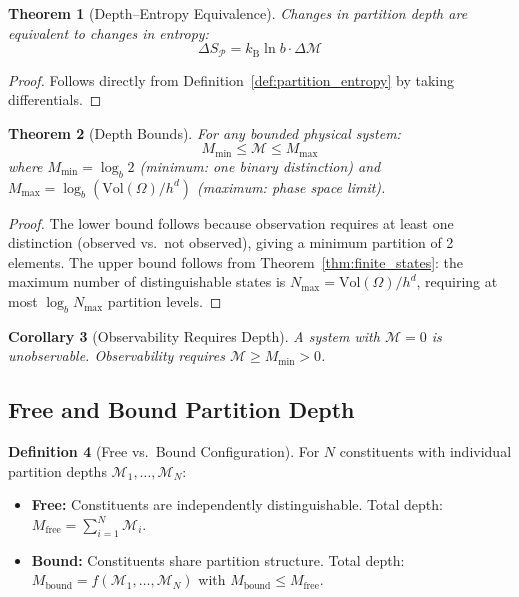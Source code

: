 \documentclass[twocolumn,10pt,a4paper]{article}
\theoremstyle{plain}
\newtheorem{theorem}{Theorem}[section]
\newtheorem{corollary}[theorem]{Corollary}
\theoremstyle{definition}
\newtheorem{definition}[theorem]{Definition}
\theoremstyle{remark}
\newcommand{\kB}{k_{\mathrm{B}}}
\newcommand{\Depth}{\mathcal{M}}
\newcommand{\Mfree}{M_{\mathrm{free}}}
\newcommand{\Mbound}{M_{\mathrm{bound}}}
\newcommand{\Mmax}{M_{\mathrm{max}}}
\newcommand{\Mmin}{M_{\mathrm{min}}}
\newcommand{\Partition}{\mathcal{P}}
\begin{document}
\begin{theorem}[Depth--Entropy Equivalence]
\label{thm:depth_entropy}
Changes in partition depth are equivalent to changes in entropy:
\begin{equation}
    \Delta S_\Partition = \kB \ln b \cdot \Delta\Depth
\end{equation}
\end{theorem}

\begin{proof}
Follows directly from Definition~\ref{def:partition_entropy} by taking differentials.
\end{proof}

\begin{theorem}[Depth Bounds]
\label{thm:depth_bounds}
For any bounded physical system:
\begin{equation}
    \Mmin \leq \Depth \leq \Mmax
\end{equation}
where $\Mmin = \log_b 2$ (minimum: one binary distinction) and $\Mmax = \log_b({\mathrm{Vol}(\Omega)}/{h^d})$ (maximum: phase space limit).
\end{theorem}

\begin{proof}
The lower bound follows because observation requires at least one distinction (observed vs.\ not observed), giving a minimum partition of 2 elements. The upper bound follows from Theorem~\ref{thm:finite_states}: the maximum number of distinguishable states is $N_{\max} = \mathrm{Vol}(\Omega)/h^d$, requiring at most $\log_b N_{\max}$ partition levels.
\end{proof}

\begin{corollary}[Observability Requires Depth]
\label{cor:observability}
A system with $\Depth = 0$ is unobservable. Observability requires $\Depth \geq \Mmin > 0$.
\end{corollary}

\subsection{Free and Bound Partition Depth}

\begin{definition}[Free vs.\ Bound Configuration]
\label{def:free_bound}
For $N$ constituents with individual partition depths $\Depth_1, \ldots, \Depth_N$:
\begin{itemize}
    \item \textbf{Free:} Constituents are independently distinguishable. Total depth: $\Mfree = \sum_{i=1}^N \Depth_i$.
    \item \textbf{Bound:} Constituents share partition structure. Total depth: $\Mbound = f(\Depth_1, \ldots, \Depth_N)$ with $\Mbound \leq \Mfree$.
\end{itemize}
\end{definition}
\end{document}
